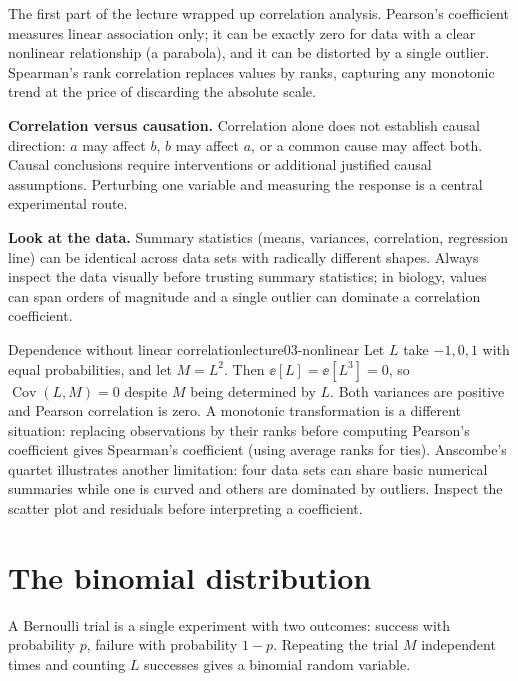 The first part of the lecture wrapped up correlation analysis. Pearson's coefficient measures linear association only; it can be exactly zero for data with a clear nonlinear relationship (a parabola), and it can be distorted by a single outlier. Spearman's rank correlation replaces values by ranks, capturing any monotonic trend at the price of discarding the absolute scale.

\begin{remark}\label{rem:lecture03-corr-caus}
\textbf{Correlation versus causation.}
Correlation alone does not establish causal direction: $a$ may affect $b$, $b$ may affect $a$, or a common cause may affect both. Causal conclusions require interventions or additional justified causal assumptions. Perturbing one variable and measuring the response is a central experimental route.
\end{remark}

\begin{remark}\label{rem:lecture03-look-at-data}
\textbf{Look at the data.}
Summary statistics (means, variances, correlation, regression line) can be identical across data sets with radically different shapes. Always inspect the data visually before trusting summary statistics; in biology, values can span orders of magnitude and a single outlier can dominate a correlation coefficient.
\end{remark}

\begin{example}{Dependence without linear correlation}{lecture03-nonlinear}
Let $L$ take $-1,0,1$ with equal probabilities, and let $M=L^2$. Then $\ee[L]=\ee[L^3]=0$, so $\operatorname{Cov}(L,M)=0$ despite $M$ being determined by $L$. Both variances are positive and Pearson correlation is zero. A monotonic transformation is a different situation: replacing observations by their ranks before computing Pearson's coefficient gives Spearman's coefficient (using average ranks for ties). Anscombe's quartet illustrates another limitation: four data sets can share basic numerical summaries while one is curved and others are dominated by outliers. Inspect the scatter plot and residuals before interpreting a coefficient.
\end{example}

\section{The binomial distribution}\label{sec:lecture03-binomial}
A Bernoulli trial is a single experiment with two outcomes: success with probability $p$, failure with probability $1-p$. Repeating the trial $M$ independent times and counting $L$ successes gives a binomial random variable.

